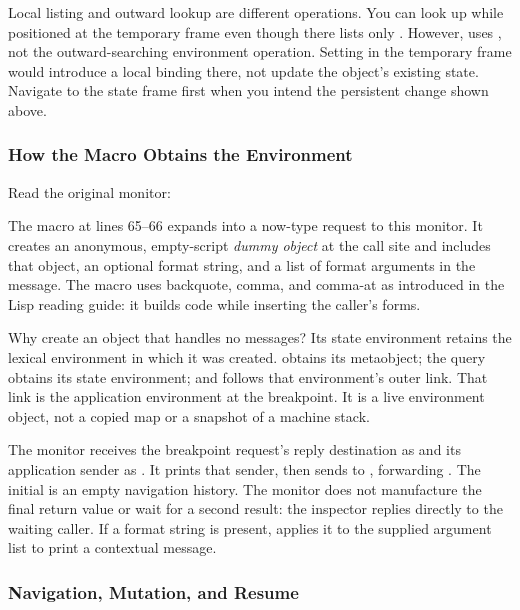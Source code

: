 Local listing and outward lookup are different operations. You can look up
 while positioned at the temporary frame even though 
there lists only . However,  uses ,
not the outward-searching  environment operation. Setting
 in the temporary frame would introduce a local binding there,
not update the object's existing state. Navigate to the state frame first
when you intend the persistent change shown above.

\subsubsection{How the Macro Obtains the Environment}

Read the original monitor:


The macro at lines 65--66 expands into a now-type request to this monitor.
It creates an anonymous, empty-script \emph{dummy object} at the call site
and includes that object, an optional format string, and a list of format
arguments in the message. The macro uses backquote, comma, and
comma-at as introduced in the Lisp reading guide: it builds code while
inserting the caller's forms.

Why create an object that handles no messages? Its state environment
retains the lexical environment in which it was created.
 obtains its metaobject;
the  query obtains its state environment; and
 follows that environment's outer link. That link is the
application environment at the breakpoint. It is a live environment object,
not a copied map or a snapshot of a machine stack.

The monitor receives the breakpoint request's reply destination as
 and its application sender as . It prints that sender,
then sends  to ,
forwarding . The initial  is an empty navigation
history. The monitor does not manufacture the final return value or wait
for a second result: the inspector replies directly to the waiting caller.
If a format string is present,  applies it to the supplied
argument list to print a contextual message.

\subsubsection{Navigation, Mutation, and Resume}

